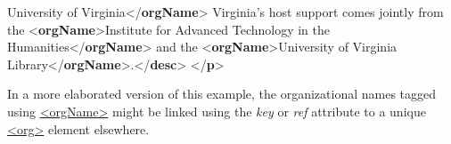 \begin{shaded}
\hspace*{1em}\mbox{}\newline 
\hspace*{1em}\mbox{}\newline 
\hspace*{1em}\hspace*{1em}University of Virginia{</\textbf{orgName}>}\mbox{}\newline 
\hspace*{1em}\hspace*{1em}Virginia's host support comes jointly from the {<\textbf{orgName}>}Institute for Advanced Technology in the\mbox{}\newline 
\hspace*{1em}\hspace*{1em}\hspace*{1em}\hspace*{1em}\hspace*{1em}\hspace*{1em}\hspace*{1em}\hspace*{1em} Humanities{</\textbf{orgName}>} and the {<\textbf{orgName}>}University of Virginia Library{</\textbf{orgName}>}.{</\textbf{desc}>}\mbox{}\newline 
\hspace*{1em}\mbox{}\newline 
{}\mbox{}\newline 
{</\textbf{p}>}\end{shaded}\egroup\par \noindent  In a more elaborated version of this example, the organizational names tagged using \hyperref[TEI.orgName]{<orgName>} might be linked using the {\itshape key} or {\itshape ref} attribute to a unique \hyperref[TEI.org]{<org>} element elsewhere.
